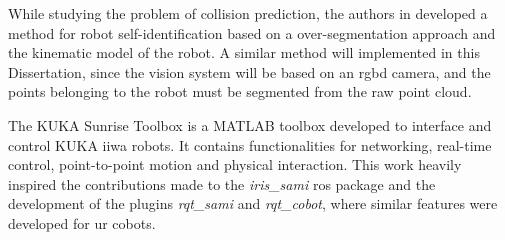 \par While studying the problem of collision prediction, the authors in \cite{spec.selfidentification} developed a method for robot self-identification based on a over-segmentation approach and the kinematic model of the robot. A similar method will implemented in this Dissertation, since the vision system will be based on an \acs{rgbd} camera, and the points belonging to the robot must be segmented from the raw point cloud.

\par The KUKA Sunrise Toolbox \cite{spec.kuka} is a MATLAB toolbox developed to interface and control KUKA iiwa robots. It contains functionalities for networking, real-time control, point-to-point motion and physical interaction. This work heavily inspired the contributions made to the \textit{iris\_sami} \ac{ros} package and the development of the plugins \textit{rqt\_sami} and \textit{rqt\_cobot}, where similar features were developed for \ac{ur} cobots.








